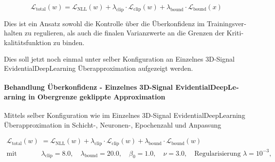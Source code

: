 \begin{otherlanguage}{ngerman}
\begin{equation}
\mathcal{L}_{\text{total}}(w) = \mathcal{L}_{\text{NLL}}(w) + \lambda_{\text{clip}} \cdot \mathcal{L}_{\text{clip}}(w) + \lambda_{\text{bound}} \cdot \mathcal{L}_{\text{bound}}(x)
\end{equation}

Dies ist ein Ansatz sowohl die Kontrolle über die Überkonfidenz im Trainingsverhalten zu regulieren, als auch die finalen Varianzwerte an die Grenzen der Kritikalitätsfunktion zu binden.

Dies soll jetzt noch einmal unter selber Konfiguration an \glqq{}Einzelnes 3D-Signal \gls{EvidentialDeepLearning} Überapproximation\grqq{} aufgezeigt werden.



\paragraph{Behandlung Überkonfidenz - \glqq{}Einzelnes 3D-Signal \gls{EvidentialDeepLearning} in Obergrenze geklippte Approximation\grqq{}}

Mittels selber Konfiguration wie im \glqq{}Einzelnes 3D-Signal \gls{EvidentialDeepLearning} Überapproximation\grqq{} in Schicht-, Neuronen-, Epochenzahl und Anpassung 

\begin{align*}
\mathcal{L}_{\text{total}}(w) &= 
\mathcal{L}_{\text{NLL}}(w) 
+ \lambda_{\text{clip}} \cdot \mathcal{L}_{\text{clip}}(w) 
+ \lambda_{\text{bound}} \cdot \mathcal{L}_{\text{bound}}(w)
\\
\text{mit} \quad 
&\lambda_{\text{clip}} = 8.0, \quad 
\lambda_{\text{bound}} = 20.0, \quad 
\beta_0 = 1.0, \quad 
\nu = 3.0, \quad 
\text{Regularisierung } \lambda = 10^{-3},
\end{align*}


\end{otherlanguage}
